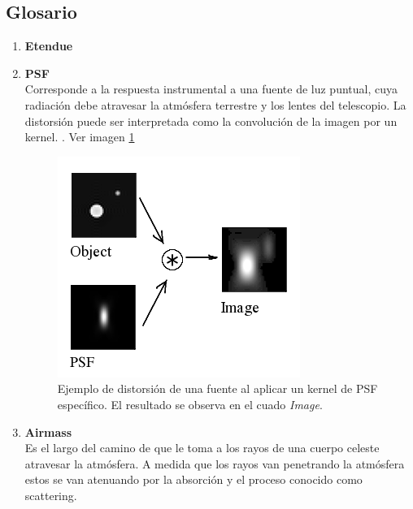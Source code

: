 
\begin{appendix} 
\section{Glosario}

\begin{enumerate}
\item{\textbf{Etendue}}\\
\label{a1:etendue}



\item{\textbf{PSF}}\\
\label{a1:psf}
Corresponde a la respuesta instrumental a una fuente de luz puntual, cuya radiaci\'on debe atravesar la atm\'osfera terrestre y los lentes del telescopio. La distorsi\'on puede ser interpretada como la convoluci\'on de la imagen por un kernel. \cite{huentelemu}. Ver imagen \ref{fig:a1}

\begin{figure}[h]
\centering
\includegraphics[scale=.5]{images/psf}
\caption{Ejemplo de distorsi\'on de una fuente al aplicar un kernel de PSF espec\'ifico. El resultado se observa en el cuado \textit{Image}.}
\label{fig:a1}
\end{figure}

\item{\textbf{Airmass}}\label{ap:airmass}\\
Es el largo del camino de que le toma a los rayos de una cuerpo celeste atravesar la atm\'osfera. A medida que los rayos van penetrando la atm\'osfera estos se van atenuando por la absorci\'on y el proceso conocido como scattering. 
\end{enumerate}
\bigskip


\end{appendix}
